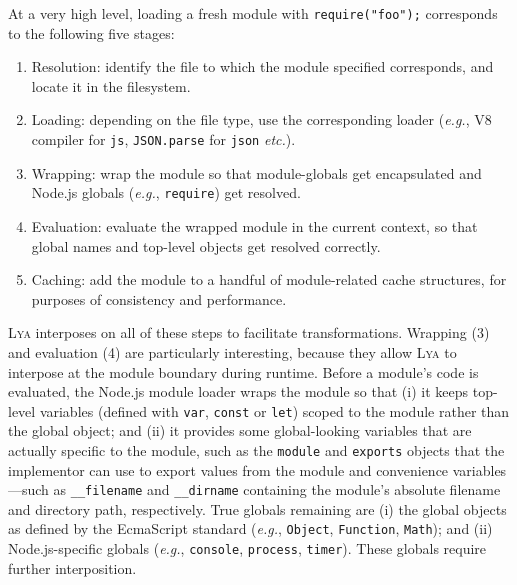 \documentclass[letterpaper,twocolumn,10pt]{article}
\def\eg{{\em e.g.}, }
\def\etc{{\em etc.}\xspace}
\newcommand{\ttt}[1]{\texttt{#1}}
\newcommand{\sys}{{\scshape Lya}\xspace}
\begin{document}
At a very high level, loading a fresh module with \ttt{require("foo");} corresponds to the following five stages:

\begin{enumerate}
\item Resolution: identify the file to which the module specified corresponds, and locate it in the filesystem.
\item Loading: depending on the file type, use the corresponding loader (\eg V8 compiler for \ttt{js}, \ttt{JSON.parse} for \ttt{json} \etc).
\item Wrapping: wrap the module so that module-globals get encapsulated and Node.js globals (\eg \ttt{require}) get resolved.
\item Evaluation: evaluate the wrapped module in the current context, so that global names and top-level objects get resolved correctly.
\item Caching: add the module to a handful of module-related cache structures, for purposes of consistency and performance.
\end{enumerate}

\sys interposes on all of these steps to facilitate transformations.
Wrapping (3) and evaluation (4) are particularly interesting, because they allow \sys to interpose at the module boundary during runtime.
Before a module's code is evaluated, the Node.js module loader wraps the module so that
  (i) it keeps top-level variables (defined with \ttt{var}, \ttt{const} or \ttt{let}) scoped to the module rather than the global object; and
  (ii) it provides some global-looking variables that are actually specific to the module, such as the \ttt{module} and \ttt{exports} objects that the implementor can use to export values from the module and convenience variables---such as \ttt{\_\_filename} and \ttt{\_\_dirname}  containing the module's absolute filename and directory path, respectively.
True globals remaining are
  (i) the global objects as defined by the EcmaScript standard (\eg \ttt{Object}, \ttt{Function}, \ttt{Math}); and
  (ii) Node.js-specific globals (\eg \ttt{console}, \ttt{process}, \ttt{timer}).
These globals require further interposition.
\end{document}

